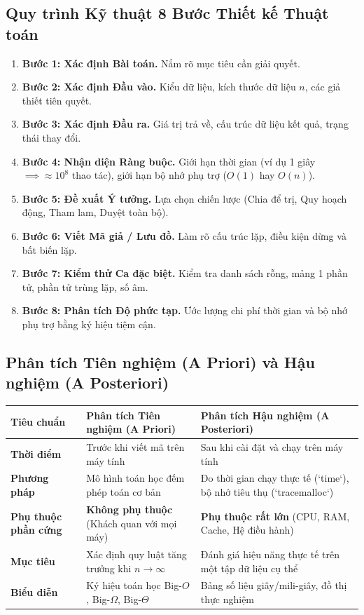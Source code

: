 \documentclass[11pt,a4paper]{article}
\begin{document}
\subsection{Quy trình Kỹ thuật 8 Bước Thiết kế Thuật toán}
\begin{enumerate}[leftmargin=2.2em, itemsep=2pt]
    \item \textbf{Bước 1: Xác định Bài toán.} Nắm rõ mục tiêu cần giải quyết.
    \item \textbf{Bước 2: Xác định Đầu vào.} Kiểu dữ liệu, kích thước dữ liệu $n$, các giả thiết tiên quyết.
    \item \textbf{Bước 3: Xác định Đầu ra.} Giá trị trả về, cấu trúc dữ liệu kết quả, trạng thái thay đổi.
    \item \textbf{Bước 4: Nhận diện Ràng buộc.} Giới hạn thời gian (ví dụ 1 giây $\implies \approx 10^8$ thao tác), giới hạn bộ nhớ phụ trợ ($O(1)$ hay $O(n)$).
    \item \textbf{Bước 5: Đề xuất Ý tưởng.} Lựa chọn chiến lược (Chia để trị, Quy hoạch động, Tham lam, Duyệt toàn bộ).
    \item \textbf{Bước 6: Viết Mã giả / Lưu đồ.} Làm rõ cấu trúc lặp, điều kiện dừng và bất biến lặp.
    \item \textbf{Bước 7: Kiểm thử Ca đặc biệt.} Kiểm tra danh sách rỗng, mảng 1 phần tử, phần tử trùng lặp, số âm.
    \item \textbf{Bước 8: Phân tích Độ phức tạp.} Ước lượng chi phí thời gian và bộ nhớ phụ trợ bằng ký hiệu tiệm cận.
\end{enumerate}

\subsection{Phân tích Tiên nghiệm (A Priori) và Hậu nghiệm (A Posteriori)}
\begin{center}
\begin{tabularx}{\textwidth}{p{3.5cm} X X}
\toprule
\textbf{Tiêu chuẩn} & \textbf{Phân tích Tiên nghiệm (A Priori)} & \textbf{Phân tích Hậu nghiệm (A Posteriori)} \\
\midrule
\textbf{Thời điểm} & Trước khi viết mã trên máy tính & Sau khi cài đặt và chạy trên máy tính \\
\textbf{Phương pháp} & Mô hình toán học đếm phép toán cơ bản & Đo thời gian chạy thực tế (`time`), bộ nhớ tiêu thụ (`tracemalloc`) \\
\textbf{Phụ thuộc phần cứng} & \textbf{Không phụ thuộc} (Khách quan với mọi máy) & \textbf{Phụ thuộc rất lớn} (CPU, RAM, Cache, Hệ điều hành) \\
\textbf{Mục tiêu} & Xác định quy luật tăng trưởng khi $n \to \infty$ & Đánh giá hiệu năng thực tế trên một tập dữ liệu cụ thể \\
\textbf{Biểu diễn} & Ký hiệu toán học Big-$O$, Big-$\Omega$, Big-$\Theta$ & Bảng số liệu giây/mili-giây, đồ thị thực nghiệm \\
\bottomrule
\end{tabularx}
\end{center}
\end{document}
